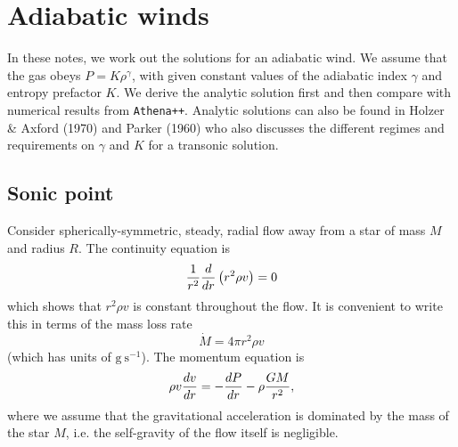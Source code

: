\documentclass[preprint,12pt]{aastex}
\begin{document}
\section{Adiabatic winds}

In these notes, we work out the solutions for an adiabatic wind. We assume that the gas obeys $P = K \rho^\gamma$, with given constant values of the adiabatic index $\gamma$ and entropy prefactor $K$. We derive the analytic solution first and then compare with numerical results from \texttt{Athena++}. Analytic solutions can also be found in Holzer \& Axford (1970) and Parker (1960) who also discusses the different regimes and requirements on $\gamma$ and $K$ for a transonic solution.

\subsection{Sonic point}

Consider spherically-symmetric, steady, radial flow away from a star of mass $M$ and radius $R$. The continuity equation is
\begin{equation}
{1\over r^2}{d\over dr}\left(r^2\rho v\right) = 0
\end{equation}
which shows that $r^2\rho v$ is constant throughout the flow. It is convenient to write this in terms of the mass loss rate 
\begin{equation}
\dot{M} = 4\pi r^2 \rho v
\end{equation}
(which has units of $\mathrm{g\ s^{-1}}$). The momentum equation is
\begin{equation}
\rho v{dv\over dr} = -{dP\over dr}-\rho {GM\over r^2},
\end{equation}
where we assume that the gravitational acceleration is dominated by the mass of the star $M$, i.e. the self-gravity of the flow itself is negligible.
\end{document}
